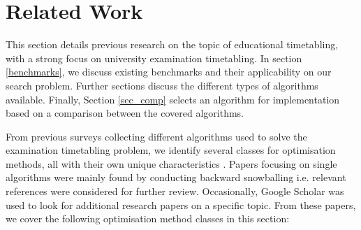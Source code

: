 
\section{Related Work}\label{sec:related-work}

This section details previous research on the topic of educational timetabling, with a strong focus on university examination timetabling. In section \ref{benchmarks}, we discuss existing benchmarks and their applicability on our search problem. Further sections discuss the different types of algorithms available. Finally, Section \ref{sec_comp} selects an algorithm for implementation based on a comparison between the covered algorithms.

From previous surveys collecting different algorithms used to solve the examination timetabling problem, we identify several classes for optimisation methods, all with their own unique characteristics \cite{joo2021, kristiansenSurvey2013, chen2021, rong2009}. Papers focusing on single algorithms were mainly found by conducting backward snowballing i.e. relevant references were considered for further review. Occasionally, Google Scholar was used to look for additional research papers on a specific topic. From these papers, we cover the following optimisation method classes in this section:
